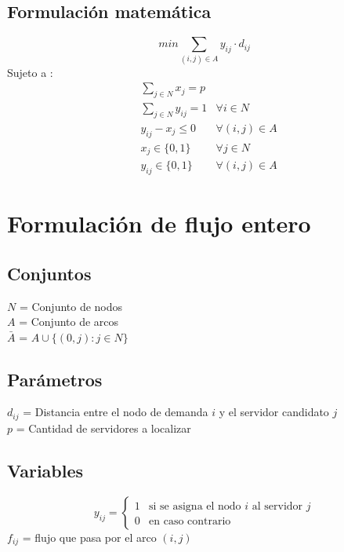 \documentclass{article}
\numberwithin{equation}{section}
\begin{document}
\subsection{Formulación matemática}
\begin{equation}
min \sum_{(i,j) \in A} y_{ij} \cdot d_{ij}
\end{equation}
Sujeto a : \begin{align}
& \sum_{j \in N} x_{j} = p \\
& \sum_{j \in N} y_{ij} = 1 &\forall i \in N \\
& y_{ij} - x_{j} \leq 0 &\forall (i,j) \in A \\
& x_{j} \in \{0,1\} &\forall j \in N\\
& y_{ij} \in \{0,1\} &\forall (i,j) \in A
\end{align}

\newpage
\section{Formulación de flujo entero}
\subsection{Conjuntos}
$N$ = Conjunto de nodos\\
$A$ = Conjunto de arcos\\
$\bar{A}$ = $A \cup \{(0,j):j \in N\} $
\subsection{Parámetros}
$d_{ij}$ = Distancia entre el nodo de demanda $i$ y el servidor candidato $j$\\
$p$ = Cantidad de servidores a localizar
\subsection{Variables}
\begin{center}
\[y_{ij}={\begin{cases}1&{\mbox{si se asigna el nodo $i$ al servidor $j$}}\\0&{\mbox{en caso contrario}}\end{cases}}
\]
$f_{ij}$ = flujo que pasa por el arco $(i,j)$
\end{center}
\end{document}

